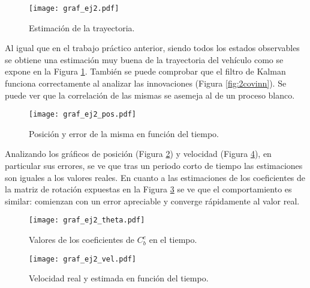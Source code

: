 
\begin{figure}[H]
\centering
\texttt{[image: graf\_ej2.pdf]}
\caption{Estimación de la trayectoria.}
\label{fig:ej2} 
\end{figure}
	Al igual que en el trabajo práctico anterior, siendo todos los estados observables se obtiene una estimación muy buena de la trayectoria del vehículo como se expone en la Figura \ref{fig:ej2}. También se puede comprobar que el filtro de Kalman funciona correctamente al analizar las innovaciones (Figura \ref{fig:2covinn}). Se puede ver que la correlación de las mismas se asemeja al de un proceso blanco.

\vspace*{\fill}
\begin{figure}[H]
\centering
\texttt{[image: graf\_ej2\_pos.pdf]}
\caption{Posición y error de la misma en función del tiempo.}
\label{fig:2pos} 
\end{figure}
\vspace*{\fill}

	Analizando los gráficos de posición (Figura \ref{fig:2pos}) y velocidad (Figura \ref{fig:2vel}), en particular sus errores, se ve que tras un periodo corto de tiempo las estimaciones son iguales a los valores reales. En cuanto a las estimaciones de los coeficientes de la matriz de rotación expuestas en la Figura \ref{fig:2theta} se ve que el comportamiento es similar: comienzan con un error apreciable y converge rápidamente al valor real.

\vspace*{\fill}

\pagebreak


\vspace*{\fill}
\begin{figure}[H]
\centering
\texttt{[image: graf\_ej2\_theta.pdf]}
\caption{Valores de los coeficientes de $C^e_b$ en el tiempo.}
\label{fig:2theta} 
\end{figure}
\vspace*{\fill}


\begin{figure}[H]
\centering
\texttt{[image: graf\_ej2\_vel.pdf]}
\caption{Velocidad real y estimada en función del tiempo.}
\label{fig:2vel} 
\end{figure}
\vspace*{\fill}
